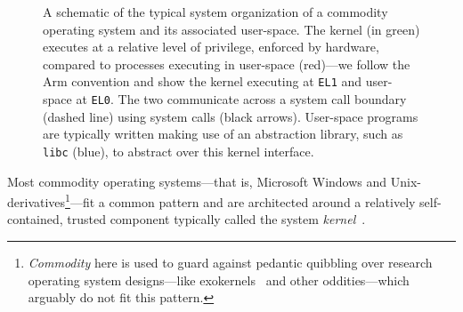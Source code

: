 \documentclass[a4paper, UKenglish, cleveref, autoref, thm-restate, colorlinks]{lipics-v2021}
\begin{document}
\begin{figure}
\caption{A schematic of the typical system organization of a commodity operating system and its associated user-space.
The kernel (in green) executes at a relative level of privilege, enforced by hardware, compared to processes executing in user-space (red)---we follow the Arm convention and show the kernel executing at \texttt{EL1} and user-space at \texttt{EL0}.
The two communicate across a system call boundary (dashed line) using system calls (black arrows).
User-space programs are typically written making use of an abstraction library, such as \texttt{libc} (blue), to abstract over this kernel interface.}
\label{fig.operating-system.schematic}
\end{figure}

Most commodity operating systems---that is, Microsoft Windows and Unix-derivatives\footnote{\emph{Commodity} here is used to guard against pedantic quibbling over research operating system designs---like exokernels~\cite{engler95exokernel} and other oddities---which arguably do not fit this pattern.}---fit a common pattern and are architected around a relatively self-contained, trusted component typically called the system \emph{kernel}~\cite{DBLP:books/daglib/0019512}.
\end{document}
